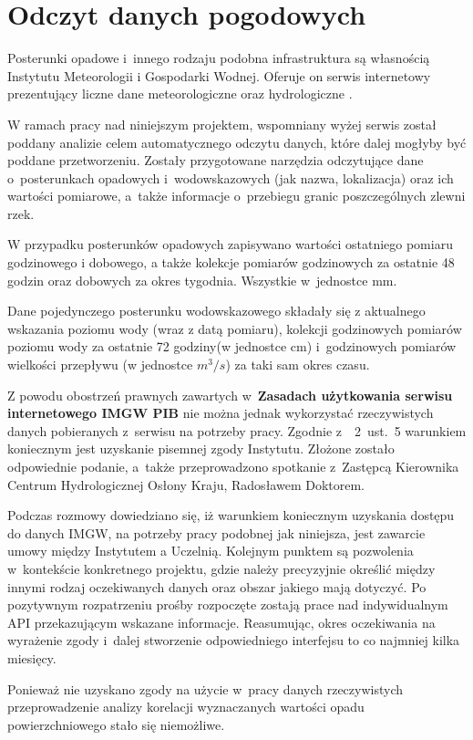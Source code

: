 \chapter{Odczyt danych pogodowych}
\label{cha:odczyt_danych}
Posterunki opadowe i~innego rodzaju podobna infrastruktura są własnością Instytutu Meteorologii i Gospodarki Wodnej. Oferuje on serwis internetowy prezentujący liczne dane meteorologiczne oraz hydrologiczne \cite{pogodynka_pl}.

W ramach pracy nad niniejszym projektem, wspomniany wyżej serwis został poddany analizie celem automatycznego odczytu danych, które dalej mogłyby być poddane przetworzeniu. Zostały przygotowane narzędzia odczytujące dane o~posterunkach opadowych i~wodowskazowych (jak nazwa, lokalizacja) oraz ich wartości pomiarowe, a~także informacje o~przebiegu granic poszczególnych zlewni rzek.

W przypadku posterunków opadowych zapisywano wartości ostatniego pomiaru godzinowego i dobowego, a także kolekcje pomiarów godzinowych za ostatnie 48 godzin oraz dobowych za okres tygodnia. Wszystkie w~jednostce mm.

Dane pojedynczego posterunku wodowskazowego składały się z aktualnego wskazania poziomu wody (wraz z datą pomiaru), kolekcji godzinowych pomiarów poziomu wody za ostatnie 72 godziny(w jednostce cm) i~godzinowych pomiarów wielkości przepływu (w jednostce $m^3/s$) za taki sam okres czasu.


Z powodu obostrzeń prawnych zawartych w~\textbf{Zasadach użytkowania serwisu internetowego IMGW PIB} nie można jednak wykorzystać rzeczywistych danych pobieranych z~serwisu na potrzeby pracy. Zgodnie z~\textsection~2~ust.~5 warunkiem koniecznym jest uzyskanie pisemnej zgody Instytutu. Złożone zostało odpowiednie podanie, a~także przeprowadzono spotkanie z~Zastępcą Kierownika Centrum Hydrologicznej Osłony Kraju, Radosławem Doktorem.

Podczas rozmowy dowiedziano się, iż warunkiem koniecznym uzyskania dostępu do danych IMGW, na potrzeby pracy podobnej jak niniejsza, jest zawarcie umowy między Instytutem a Uczelnią. Kolejnym punktem są pozwolenia w~kontekście konkretnego projektu, gdzie należy precyzyjnie określić między innymi rodzaj oczekiwanych danych oraz obszar jakiego mają dotyczyć. Po pozytywnym rozpatrzeniu prośby rozpoczęte zostają prace nad indywidualnym API przekazującym wskazane informacje. Reasumując, okres oczekiwania na wyrażenie zgody i~dalej stworzenie odpowiedniego interfejsu to co najmniej kilka miesięcy.

Ponieważ nie uzyskano zgody na użycie w~pracy danych rzeczywistych przeprowadzenie analizy korelacji wyznaczanych wartości opadu powierzchniowego stało się niemożliwe. 